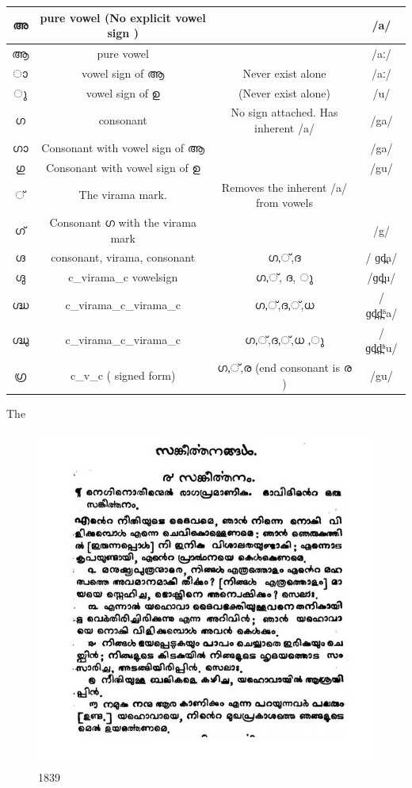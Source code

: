 \documentclass[10pt]{article}
\begin{document}
{

\begin{tabular}{|c|c|c|c|}
\hline
അ  &  pure vowel (No explicit  vowel sign ) & &/a/ \\
\hline
ആ  &  pure vowel && /aː/ \\
\hline
ാ & vowel sign of ആ  &Never exist alone &   /aː/ \\  
\hline
ു & vowel sign of ഉ &(Never exist alone) &  /u/ \\
\hline
ഗ &  consonant & No sign attached. Has inherent /a/  & /ga/  \\
\hline
ഗാ & Consonant with vowel sign of ആ&  &  /ga/  \\  
\hline
ഗു & Consonant with vowel sign of ഉ &  & /gu/  \\ 
\hline
് & The virama mark.&Removes the inherent /a/ from vowels & \\
\hline
ഗ് & Consonant ഗ with the virama mark& & /g/ \\
\hline
ഗ്ദ  & consonant, virama, consonant & ഗ,്,ദ &  / ɡd̪a/  \\
\hline
ഗ്ദു & c\_virama\_c vowelsign & ഗ,്, ദ, ു & /ɡd̪u/ \\
\hline
ഗ്ദ്ധ   & c\_virama\_c\_virama\_c   & ഗ,്,ദ,്,ധ  & / ɡd̪d̪ʱa/  \\ 
\hline
ഗ്ദ്ധു &  c\_virama\_c\_virama\_c  &  ഗ,്,ദ,്,ധ ,ു  &  /   ɡd̪d̪ʱu/ \\
\hline
ഗ്ര & c\_v\_c ( signed form)  &  ഗ,്,ര (end consonant is ര ) & /gu/  \\ 
\hline


\end{tabular}

}

The 

\begin{figure}[h]
  \centering
   \includegraphics[scale=0.5]{images/1839-Book-of-psalms.png}
     \caption{1839}
\end{figure}
\end{document}
